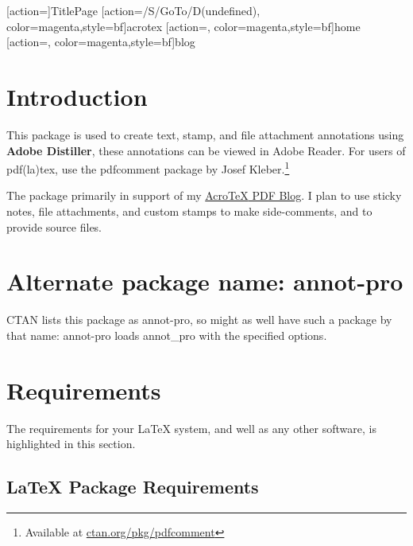 \documentclass[12pt]{article}
\def\pkg{\textsf}
\begin{document}
\maketitle

[action={}]{TitlePage}
[action={/S/GoTo/D(undefined)},%
  color=magenta,style={bf}]{acrotex}
[action={},%
  color=magenta,style={bf}]{home}
[action={},%
  color=magenta,style={bf}]{blog}


\tableofcontents
{}

\section{Introduction}

This package is used to create text, stamp, and file attachment
annotations using \textbf{Adobe Distiller}, these annotations can be
viewed in Adobe Reader. For users of \textsf{pdf(la)tex}, use the
\textsf{pdfcomment} package by Josef Kleber.\footnote{Available at \href{http://ctan.org/pkg/pdfcomment}{ctan.org/pkg/pdfcomment}}

The package primarily in support of my \href{http://www.math.uakron.edu/~dpstory}
{{Acro\negthinspace\TeX} PDF Blog}. I plan to use sticky notes, file attachments, and
custom stamps to make side-comments, and to provide source files.

\section{Alternate package name: \texorpdfstring{\protect\pkg{annot-pro}}{annot-pro}}

CTAN lists this package as \pkg{annot-pro}, so might as well have such a package by that name:
\pkg{annot-pro} loads \pkg{annot\_pro} with the specified options.

\section{Requirements}

The requirements for your {\LaTeX} system, and well as any other
software, is highlighted in this section.

\subsection{{\LaTeX} Package Requirements}
\end{document}
